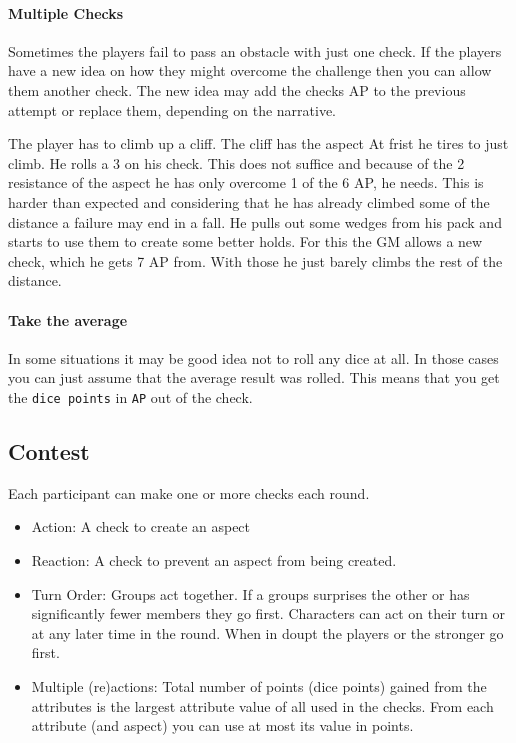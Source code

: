 \documentclass[11pt]{article}
\begin{document}
{\paragraph*{Multiple Checks}
\label{sec:orgc2bc360}
Sometimes the players fail to pass an obstacle with just one check. If the players have a new idea on how they might overcome the challenge then you can allow them another check. The new idea may add the checks AP to the previous attempt or replace them, depending on the narrative.

\begin{pwexample}
The player has to climb up a cliff. The cliff has the aspect  At frist he tires to just climb. He rolls a 3 on his check. This does not suffice and because of the 2 resistance of the aspect he has only overcome 1 of the 6 AP, he needs. This is harder than expected and considering that he has already climbed some of the distance a failure may end in a fall. He pulls out some wedges from his pack and starts to use them to create some better holds. For this the GM allows a new check, which he gets 7 AP from. With those he just barely climbs the rest of the distance.
\end{pwexample}
\paragraph*{Take the average}
\label{sec:orgd949dcb}
In some situations it may be good idea not to roll any dice at all. In those cases you can just assume that the average result was rolled. This means that you get the \texttt{dice points} in \texttt{AP} out of the check. 
\subsection{Contest}
\label{sec:org330c21e}
\begin{short}
Each participant can make one or more checks each round.
\begin{itemize}
\item Action: A check to create an aspect
\item Reaction: A check to prevent an aspect from being created.
\item Turn Order: Groups act together. If a groups surprises the other or has significantly fewer members they go first. Characters can act on their turn or at any later time in the round. When in doupt the players or the stronger go first.
\item Multiple (re)actions: Total number of points (dice points) gained from the attributes is the largest attribute value of all used in the checks. From each attribute (and aspect) you can use at most its value in points.
\end{itemize}
\end{short}

}
\end{document}
